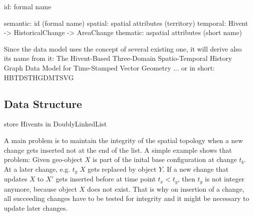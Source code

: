 id: formal name

semantic: id (formal name)
spatial:  spatial attributes (territory)
temporal: Hivent -> HistoricalChange -> AreaChange
thematic: aspatial attributes (short name)

Since the data model uses the concept of several existing one, it will derive also its name from it: The Hivent-Based Three-Domain Spatio-Temporal History Graph Data Model for Time-Stamped Vector Geometry
... or in short: HBTDSTHGDMTSVG


\subsection{Data Structure} %
\label{sub:data_structure}

store Hivents in DoublyLinkedList



A main problem is to maintain the integrity of the spatial topology when a new change gets inserted not at the end of the list. A simple example shows that problem: Given geo-object $X$ is part of the inital base configuration at change $t_b$. At a later change, e.g. $t_y$ $X$ gets replaced by object $Y$. If a new change that updates $X$ to $X'$ gets inserted before at time point $t_x < t_y$, then $t_y$ is not integer anymore, because object $X$ does not exist. That is why on insertion of a change, all succeeding changes have to be tested for integrity and it might be necessary to update later changes.





